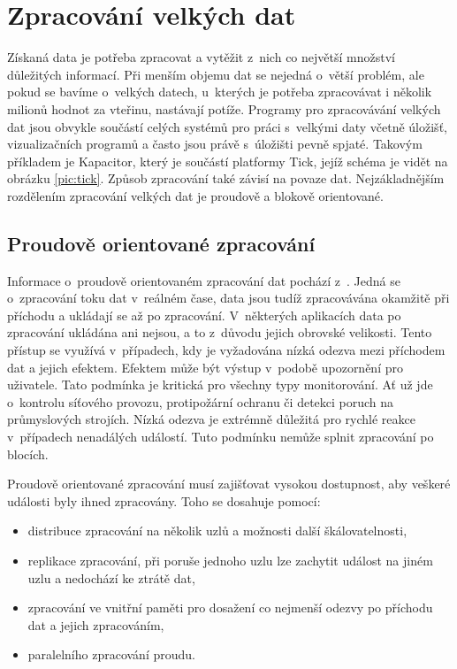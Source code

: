 \chapter{Zpracování velkých dat}\label{kap:bigData}
Získaná data je potřeba zpracovat a vytěžit z~nich co největší množství důležitých informací. Při menším objemu dat se nejedná o~větší problém, ale pokud se bavíme o~velkých datech, u~kterých je potřeba zpracovávat i několik milionů hodnot za vteřinu, nastávají potíže. Programy pro zpracovávání velkých dat jsou obvykle součástí celých systémů pro práci s~velkými daty včetně úložišť, vizualizačních programů a často jsou právě s~úložišti pevně spjaté. Takovým příkladem je Kapacitor, který je součástí platformy Tick, jejíž schéma je vidět na obrázku \ref{pic:tick}. Způsob zpracování také závisí na povaze dat. Nejzákladnějším rozdělením zpracování velkých dat je proudově a blokově orientované.

\section{Proudově orientované zpracování}
Informace o~proudově orientovaném zpracování dat pochází z~\cite{BigDataPlatforms}. Jedná se o~zpracování toku dat v~reálném čase, data jsou tudíž zpracovávána okamžitě při příchodu a ukládají se až po zpracování. V~některých aplikacích data po zpracování ukládána ani nejsou, a to z~důvodu jejich obrovské velikosti. Tento přístup se využívá v~případech, kdy je vyžadována nízká odezva mezi příchodem dat a jejich efektem. Efektem může být výstup v~podobě upozornění pro uživatele. Tato podmínka je kritická pro všechny typy monitorování. Ať už jde o~kontrolu síťového provozu, protipožární ochranu či detekci poruch na průmyslových strojích. Nízká odezva je extrémně důležitá pro rychlé reakce v~případech nenadálých událostí. Tuto podmínku nemůže splnit zpracování po blocích. 

Proudově orientované zpracování musí zajišťovat vysokou dostupnost, aby veškeré události byly ihned zpracovány. Toho se dosahuje pomocí:
\begin{itemize}
    \item distribuce zpracování na několik uzlů a možnosti další škálovatelnosti,
    \item replikace zpracování, při poruše jednoho uzlu lze zachytit událost na jiném uzlu a nedochází ke ztrátě dat,
    \item zpracování ve vnitřní paměti pro dosažení co nejmenší odezvy po příchodu dat a jejich zpracováním, 
    \item paralelního zpracování proudu.
\end{itemize}

